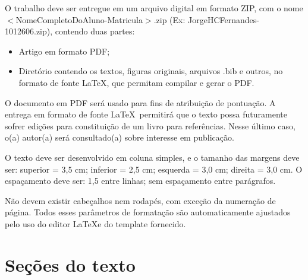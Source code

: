\documentclass[12pt]{article}
\begin{document}
	O trabalho deve ser entregue em um arquivo digital em formato ZIP, com o nome $<$NomeCompletoDoAluno-Matricula$>$.zip (Ex: JorgeHCFernandes-1012606.zip), contendo duas partes:
	\begin{itemize}
		\item Artigo em formato PDF;
		\item Diretório contendo os textos, figuras originais, arquivos .bib e outros, no formato de fonte \LaTeX, que permitam compilar e gerar o PDF.
	\end{itemize}

	O documento em PDF será usado para fins de atribuição de pontuação.
	A entrega em formato de fonte \LaTeX\ permitirá que o texto possa futuramente sofrer edições para constituição de um livro para referências.
	Nesse último caso, o(a) autor(a) será consultado(a) sobre interesse em publicação.

	O texto deve ser desenvolvido em coluna simples, e o tamanho das margens deve ser: superior = 3,5 cm; inferior = 2,5 cm; esquerda = 3,0 cm; direita = 3,0 cm.
	O espaçamento deve ser: 1,5 entre linhas; sem espaçamento entre parágrafos.

	Não devem existir cabeçalhos nem rodapés, com exceção da numeração de página.
	Todos esses parâmetros de formatação são automaticamente ajustados pelo uso do editor \LaTeX e do template fornecido.

	\section{\label{secoes:texto}Seções do texto}
\end{document}
